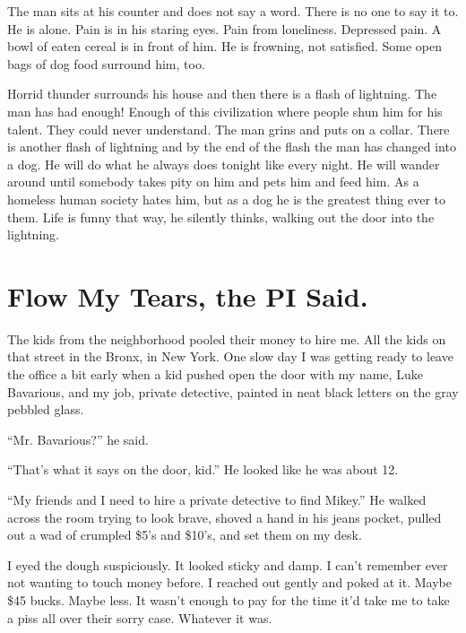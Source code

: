The man sits at his counter and does not say a word. There is no
one to say it to. He is alone. Pain is in his staring eyes. Pain
from loneliness. Depressed pain. A bowl of eaten cereal is in front
of him. He is frowning, not satisfied. Some open bags of dog food
surround him, too.



Horrid thunder surrounds his house and then there is a flash of
lightning. The man has had enough! Enough of this civilization
where people shun him for his talent. They could never understand.
The man grins and puts on a collar. There is another flash of
lightning and by the end of the flash the man has changed into a
dog. He will do what he always does tonight like every night. He
will wander around until somebody takes pity on him and pets him
and feed him. As a homeless human society hates him, but as a dog
he is the greatest thing ever to them. Life is funny that way, he
silently thinks, walking out the door into the lightning. 

 




\chapter{Flow My Tears, the PI Said.}



The kids from the neighborhood pooled their money to hire me. All
the kids on that street in the Bronx, in New York. One slow day I
was getting ready to leave the office a bit early when a kid pushed
open the door with my name, Luke Bavarious, and my job, private
detective, painted in neat black letters on the gray pebbled
glass.



``Mr. Bavarious?'' he said.

``That's what it says on the door, kid.'' He looked
like he was about 12.

``My friends and I need to hire a private detective to find
Mikey.'' He walked across the room trying to look brave,
shoved a hand in his jeans pocket, pulled out a wad of crumpled
\$5's and \$10's, and set them on my desk.



I eyed the dough suspiciously. It looked sticky and damp. I
can't remember ever not wanting to touch money before. I
reached out gently and poked at it. Maybe \$45 bucks. Maybe less. It
wasn't enough to pay for the time it'd take me to take
a piss all over their sorry case. Whatever it was.



